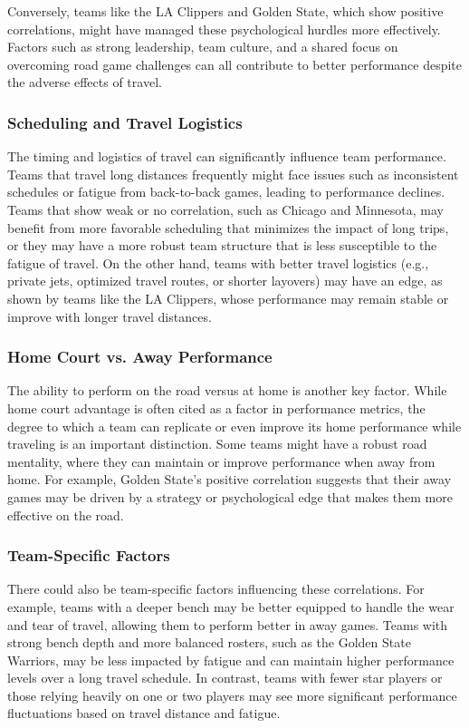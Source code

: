 \documentclass[12pt]{article}
\begin{document}
Conversely, teams like the LA Clippers and Golden State, which show positive correlations, might have managed these psychological hurdles more effectively. Factors such as strong leadership, team culture, and a shared focus on overcoming road game challenges can all contribute to better performance despite the adverse effects of travel.

\subsubsection{Scheduling and Travel Logistics}
The timing and logistics of travel can significantly influence team performance. Teams that travel long distances frequently might face issues such as inconsistent schedules or fatigue from back-to-back games, leading to performance declines. Teams that show weak or no correlation, such as Chicago and Minnesota, may benefit from more favorable scheduling that minimizes the impact of long trips, or they may have a more robust team structure that is less susceptible to the fatigue of travel. On the other hand, teams with better travel logistics (e.g., private jets, optimized travel routes, or shorter layovers) may have an edge, as shown by teams like the LA Clippers, whose performance may remain stable or improve with longer travel distances.

\subsubsection{Home Court vs. Away Performance}
The ability to perform on the road versus at home is another key factor. While home court advantage is often cited as a factor in performance metrics, the degree to which a team can replicate or even improve its home performance while traveling is an important distinction. Some teams might have a robust road mentality, where they can maintain or improve performance when away from home. For example, Golden State’s positive correlation suggests that their away games may be driven by a strategy or psychological edge that makes them more effective on the road.

\subsubsection{Team-Specific Factors}
There could also be team-specific factors influencing these correlations. For example, teams with a deeper bench may be better equipped to handle the wear and tear of travel, allowing them to perform better in away games. Teams with strong bench depth and more balanced rosters, such as the Golden State Warriors, may be less impacted by fatigue and can maintain higher performance levels over a long travel schedule. In contrast, teams with fewer star players or those relying heavily on one or two players may see more significant performance fluctuations based on travel distance and fatigue.
\end{document}

